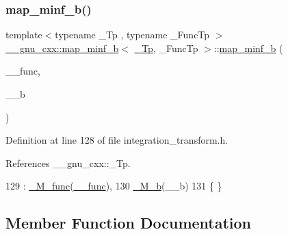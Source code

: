 \subsubsection{\texorpdfstring{map\+\_\+minf\+\_\+b()}{map\_minf\_b()}}
{\footnotesize\ttfamily template$<$typename \+\_\+\+Tp , typename \+\_\+\+Func\+Tp $>$ \\
\hyperlink{struct____gnu__cxx_1_1map__minf__b}{\+\_\+\+\_\+gnu\+\_\+cxx\+::map\+\_\+minf\+\_\+b}$<$ \hyperlink{namespace____gnu__cxx_a3b19a9c800ca194374ef9172290f7d79}{\+\_\+\+Tp}, \+\_\+\+Func\+Tp $>$\+::\hyperlink{struct____gnu__cxx_1_1map__minf__b}{map\+\_\+minf\+\_\+b} (\begin{DoxyParamCaption}\item[{\+\_\+\+Func\+Tp}]{\+\_\+\+\_\+func,  }\item[{\hyperlink{namespace____gnu__cxx_a3b19a9c800ca194374ef9172290f7d79}{\+\_\+\+Tp}}]{\+\_\+\+\_\+b }\end{DoxyParamCaption})\hspace{0.3cm}{\ttfamily [inline]}}



Definition at line 128 of file integration\+\_\+transform.\+h.



References \+\_\+\+\_\+gnu\+\_\+cxx\+::\+\_\+\+Tp.


\begin{DoxyCode}
129       : \hyperlink{struct____gnu__cxx_1_1map__minf__b_a6eeb7b723b6bb691690adfbdec7b4648}{\_M\_func}(\hyperlink{namespace____gnu__cxx_af2b2f0c7a2ae72b922b1afefae5a65b2}{\_\_func}),
130         \hyperlink{struct____gnu__cxx_1_1map__minf__b_a03b2c7b30f21200812f87251cd0aff66}{\_M\_b}(\_\_b)
131       \{ \}
\end{DoxyCode}


\subsection{Member Function Documentation}
\mbox{\label{struct____gnu__cxx_1_1map__minf__b_a4e9a67a4d37675e4c1ca3e0bff74ade3}} 
